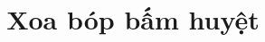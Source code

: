 \documentclass{article}
\title{Xoa bóp bấm huyệt}
\begin{document}
\keepXColumns




\tableofcontents
\newpage






% 


\nocite{*}

\end{document}
